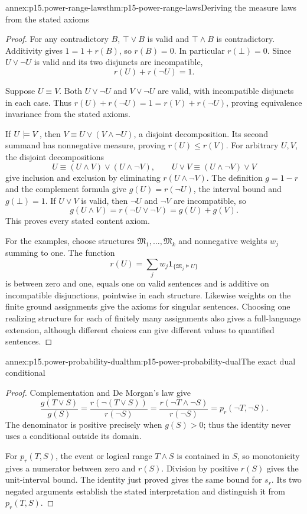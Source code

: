 \begin{annexitem}{annex:p15.power-range-laws}{thm:p15-power-range-laws}{Deriving the measure laws from the stated axioms}
\begin{proof}
For any contradictory \(B\),
\(\top\lor B\) is valid
and \(\top\land B\)
is contradictory. Additivity
gives \(1=1+r(B)\),
so \(r(B)=0\).
In particular \(r(\bot)=0\).
Since \(U\lor\neg U\)
is valid and its
two disjuncts are
incompatible,
\[
                         r(U)+r(\neg U)=1 .
\]

Suppose \(U\equiv V\).
Both \(U\lor\neg U\)
and \(V\lor\neg U\)
are valid, with incompatible
disjuncts in each case.
Thus
\(r(U)+r(\neg U)=1
=r(V)+r(\neg U)\),
proving equivalence invariance
from the stated axioms.

If \(U\models V\),
then \(V\equiv U\lor(V\land\neg U)\),
a disjoint decomposition.
Its second summand has
nonnegative measure, proving
\(r(U)\le r(V)\).
For arbitrary \(U,V\),
the disjoint decompositions
\[
 U\equiv(U\land V)\lor(U\land\neg V),
 \qquad
 U\lor V\equiv(U\land\neg V)\lor V
\]
give inclusion and exclusion
by eliminating \(r(U\land\neg V)\).
The definition \(g=1-r\)
and the complement formula
give \(g(U)=r(\neg U)\),
the interval bound and
\(g(\bot)=1\).
If \(U\lor V\) is
valid, then \(\neg U\)
and \(\neg V\) are
incompatible, so
\[
 g(U\land V)=r(\neg U\lor\neg V)
                           =g(U)+g(V).
\]
This proves every stated
content axiom.

For the examples, choose
structures \(\mathfrak M_1,\ldots,\mathfrak M_k\)
and nonnegative weights
\(w_j\) summing to one.
The function
\[
 r(U)=\sum_j w_j\mathbf1_{\{\mathfrak M_j\models U\}}
\]
is between zero and one,
equals one on valid
sentences and is additive
on incompatible disjunctions,
pointwise in each structure.
Likewise weights on the
finite ground assignments
give the axioms for
singular sentences.
Choosing one realizing
structure for each of
finitely many assignments
also gives a full-language
extension, although different
choices can give different
values to quantified sentences.
\end{proof}
\end{annexitem}

\begin{annexitem}{annex:p15.power-probability-dual}{thm:p15-power-probability-dual}{The exact dual conditional}
\begin{proof}
Complementation and De Morgan's law give
\[
 \frac{g(T\lor S)}{g(S)}
 =\frac{r(\neg(T\lor S))}{r(\neg S)}
 =\frac{r(\neg T\land\neg S)}{r(\neg S)}
 =p_r(\neg T,\neg S).
\]
The denominator is positive
precisely when \(g(S)>0\);
thus the identity never
uses a conditional outside
its domain.

For \(p_r(T,S)\), the
event or logical range
\(T\land S\) is contained
in \(S\), so monotonicity
gives a numerator between
zero and \(r(S)\).
Division by positive
\(r(S)\) gives the
unit-interval bound.
The identity just proved
gives the same bound
for \(s_r\).
Its two negated arguments
establish the stated
interpretation and distinguish
it from \(p_r(T,S)\).
\end{proof}
\end{annexitem}

